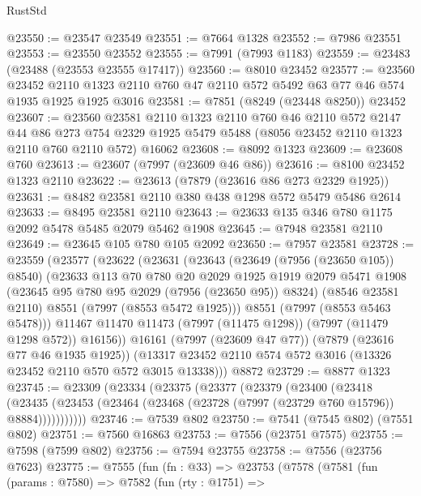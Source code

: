 \begin{lexlean}{RustStd}
\begin{coremodule}
@23550 := @23547 @23549
@23551 := @7664 @1328
@23552 := @7986 @23551
@23553 := @23550 @23552
@23555 := @7991 (@7993 @1183)
@23559 := @23483 (@23488 (@23553 @23555 @17417))
@23560 := @8010 @23452
@23577 := @23560
    @23452
    @2110
    @1323
    @2110
    @760
    @47
    @2110
    @572
    @5492
    @63
    @77
    @46
    @574
    @1935
    @1925
    @1925
    @3016
@23581 := @7851 (@8249 (@23448 @8250)) @23452
@23607 := @23560
    @23581
    @2110
    @1323
    @2110
    @760
    @46
    @2110
    @572
    @2147
    @44
    @86
    @273
    @754
    @2329
    @1925
    @5479
    @5488
    (@8056 @23452 @2110 @1323 @2110 @760 @2110 @572)
    @16062
@23608 := @8092 @1323
@23609 := @23608 @760
@23613 := @23607 (@7997 (@23609 @46 @86))
@23616 := @8100 @23452 @1323 @2110
@23622 := @23613 (@7879 (@23616 @86 @273 @2329 @1925))
@23631 := @8482 @23581 @2110 @380 @438 @1298 @572 @5479 @5486 @2614
@23633 := @8495 @23581 @2110
@23643 := @23633 @135 @346 @780 @1175 @2092 @5478 @5485 @2079 @5462 @1908
@23645 := @7948 @23581 @2110
@23649 := @23645 @105 @780 @105 @2092
@23650 := @7957 @23581
@23728 := @23559
    (@23577
      (@23622
        (@23631
          (@23643
            (@23649 (@7956 (@23650 @105)) @8540)
            (@23633
              @113
              @70
              @780
              @20
              @2029
              @1925
              @1919
              @2079
              @5471
              @1908
              (@23645 @95 @780 @95 @2029 (@7956 (@23650 @95)) @8324)
              (@8546 @23581 @2110)
              @8551
              (@7997 (@8553 @5472 @1925)))
            @8551
            (@7997 (@8553 @5463 @5478)))
          @11467
          @11470
          @11473
          (@7997 (@11475 @1298))
          (@7997 (@11479 @1298 @572))
          @16156))
      @16161
      (@7997 (@23609 @47 @77))
      (@7879 (@23616 @77 @46 @1935 @1925))
      (@13317 @23452 @2110 @574 @572 @3016 (@13326 @23452 @2110 @570 @572 @3015 @13338)))
    @8872
@23729 := @8877 @1323
@23745 := @23309
    (@23334
      (@23375
        (@23377
          (@23379
            (@23400
              (@23418
                (@23435
                  (@23453 (@23464 (@23468 (@23728 (@7997 (@23729 @760 @15796)) @8884)))))))))))
@23746 := @7539 @802
@23750 := @7541 (@7545 @802) (@7551 @802)
@23751 := @7560 @16863
@23753 := @7556 (@23751 @7575)
@23755 := @7598 (@7599 @802)
@23756 := @7594 @23755
@23758 := @7556 (@23756 @7623)
@23775 := @7555
    (fun (fn : @33) =>
    @23753
      (@7578
        (@7581
          (fun (params : @7580) =>
          @7582
            (fun (rty : @1751) =>

\end{coremodule}
\end{lexlean}
